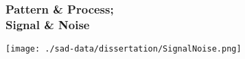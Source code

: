 \documentclass[14pt]{beamer}
\begin{document}
\begin{frame}
\frametitle{Pattern \& Process;\\ Signal \& Noise}
\begin{center}
\texttt{[image: ./sad-data/dissertation/SignalNoise.png]}
\end{center}
\end{frame}


\end{document}
